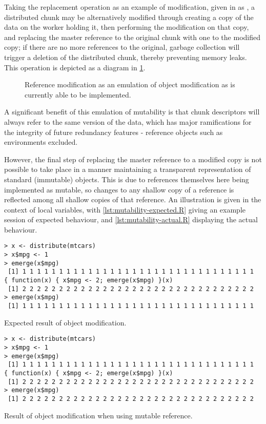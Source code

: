 Taking the replacement operation as an example of modification, given in \R{} as \code{\$<-}, a distributed chunk may be alternatively modified through creating a copy of the data on the worker holding it, then performing the modification on that copy, and replacing the master reference to the original chunk with one to the modified copy; if there are no more references to the original, garbage collection will trigger a deletion of the distributed chunk, thereby preventing memory leaks.
This operation is depicted as a diagram in \cref{fig:modifyref}.

\begin{figure}

\caption{Reference modification as an emulation of object modification as is currently able to be implemented.}
\label{fig:modifyref}
\end{figure}

A significant benefit of this emulation of mutability is that chunk descriptors will always refer to the same version of the data, which has major ramifications for the integrity of future redundancy features - reference objects such as environments excluded.

However, the final step of replacing the master reference to a modified copy is not possible to take place in a manner maintaining a transparent representation of standard (immutable) \R{} objects.
This is due to references themselves here being implemented as mutable, so changes to any shallow copy of a reference is reflected among all shallow copies of that reference.
An illustration is given in the context of local variables, with \cref{lst:mutability-expected.R} giving an example \R{} session of expected behaviour, and \cref{lst:mutability-actual.R} displaying the actual behaviour.

\begin{listing}
\begin{verbatim}
> x <- distribute(mtcars)
> x$mpg <- 1
> emerge(x$mpg)
 [1] 1 1 1 1 1 1 1 1 1 1 1 1 1 1 1 1 1 1 1 1 1 1 1 1 1 1 1 1 1 1 1 1
{ function(x) { x$mpg <- 2; emerge(x$mpg) }(x)
 [1] 2 2 2 2 2 2 2 2 2 2 2 2 2 2 2 2 2 2 2 2 2 2 2 2 2 2 2 2 2 2 2 2
> emerge(x$mpg)
 [1] 1 1 1 1 1 1 1 1 1 1 1 1 1 1 1 1 1 1 1 1 1 1 1 1 1 1 1 1 1 1 1 1
\end{verbatim}
\caption{Expected result of object modification.}
\label{lst:mutability-expected.R}
\end{listing}

\begin{listing}
\begin{verbatim}
> x <- distribute(mtcars)
> x$mpg <- 1
> emerge(x$mpg)
 [1] 1 1 1 1 1 1 1 1 1 1 1 1 1 1 1 1 1 1 1 1 1 1 1 1 1 1 1 1 1 1 1 1
{ function(x) { x$mpg <- 2; emerge(x$mpg) }(x)
 [1] 2 2 2 2 2 2 2 2 2 2 2 2 2 2 2 2 2 2 2 2 2 2 2 2 2 2 2 2 2 2 2 2
> emerge(x$mpg)
 [1] 2 2 2 2 2 2 2 2 2 2 2 2 2 2 2 2 2 2 2 2 2 2 2 2 2 2 2 2 2 2 2 2
\end{verbatim}
\caption{Result of object modification when using mutable reference.}
\label{lst:mutability-actual.R}
\end{listing}


